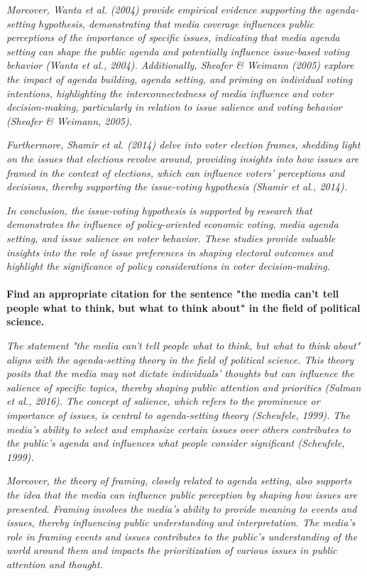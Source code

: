 \documentclass[11pt,a4paper]{article}
\begin{document}
 \textit{Moreover, Wanta et al. (2004) provide empirical evidence supporting the agenda-setting hypothesis, demonstrating that media coverage influences public perceptions of the importance of specific issues, indicating that media agenda setting can shape the public agenda and potentially influence issue-based voting behavior (Wanta et al., 2004). Additionally, Sheafer \& Weimann (2005) explore the impact of agenda building, agenda setting, and priming on individual voting intentions, highlighting the interconnectedness of media influence and voter decision-making, particularly in relation to issue salience and voting behavior (Sheafer \& Weimann, 2005).}

 \textit{Furthermore, Shamir et al. (2014) delve into voter election frames, shedding light on the issues that elections revolve around, providing insights into how issues are framed in the context of elections, which can influence voters' perceptions and decisions, thereby supporting the issue-voting hypothesis (Shamir et al., 2014).}

 \textit{In conclusion, the issue-voting hypothesis is supported by research that demonstrates the influence of policy-oriented economic voting, media agenda setting, and issue salience on voter behavior. These studies provide valuable insights into the role of issue preferences in shaping electoral outcomes and highlight the significance of policy considerations in voter decision-making.}
\\
\\
 \textbf{Find an appropriate citation for the sentence "the media can't tell people what to think, but what to think about" in the field of political science.}

\textit{The statement "the media can't tell people what to think, but what to think about" aligns with the agenda-setting theory in the field of political science. This theory posits that the media may not dictate individuals' thoughts but can influence the salience of specific topics, thereby shaping public attention and priorities (Salman et al., 2016). The concept of salience, which refers to the prominence or importance of issues, is central to agenda-setting theory (Scheufele, 1999). The media's ability to select and emphasize certain issues over others contributes to the public's agenda and influences what people consider significant (Scheufele, 1999).}

 \textit{Moreover, the theory of framing, closely related to agenda setting, also supports the idea that the media can influence public perception by shaping how issues are presented. Framing involves the media's ability to provide meaning to events and issues, thereby influencing public understanding and interpretation. The media's role in framing events and issues contributes to the public's understanding of the world around them and impacts the prioritization of various issues in public attention and thought.}
\end{document}
